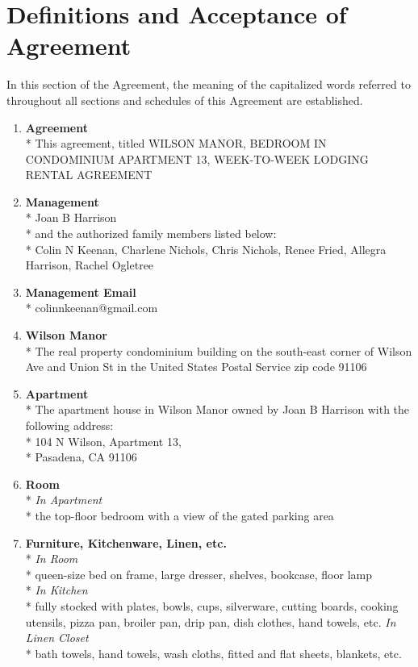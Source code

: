 \documentclass[12pt,letterpaper]{article}
\newcommand{\agreementtitle}{WILSON MANOR, BEDROOM IN CONDOMINIUM APARTMENT 13, WEEK-TO-WEEK LODGING RENTAL AGREEMENT}
\newcommand{\definitions}{Definitions and Acceptance of Agreement}
\newcommand{\mom}{Joan B Harrison}
\newcommand{\management}{Management}
\newcommand{\myemail}{Management Email}
\newcommand{\condo}{Wilson Manor}
\newcommand{\apt}{Apartment}
\newcommand{\room}{Room}
\newcommand{\furniture}{Furniture, Kitchenware, Linen, etc.}
\begin{document}
	\section{\definitions{}} \label{definitions}
In this section of the Agreement, the meaning of the capitalized words referred to throughout all sections and schedules of this Agreement are established.
\begin{multicols}{2}
	\begin{enumerate} 
		\item \textbf{Agreement}\\* \label{agreement}
			This agreement, titled \agreementtitle{}
		\item \textbf{\management{}}\\* \label{management}
			\noindent \mom{}\\*
			and the authorized family members listed below:\\*
			Colin N Keenan,
			Charlene Nichols,
			Chris Nichols,
			Renee Fried,
			Allegra Harrison,
			Rachel Ogletree
				
		\item \textbf{\myemail{}}\\* \label{myemail}
			colinnkeenan@gmail.com

		\item \textbf{\condo{}}\\* \label{condo}
			The real property condominium building on the south-east corner of Wilson Ave and Union St in the United States Postal Service zip code 91106

		\item \textbf{\apt{}}\\* \label{apt}
			The apartment house in \condo{} owned by \mom{} with the following address:\\*
			104 N Wilson, \apt{} 13,\\* 
			Pasadena, CA  91106


\vfill
\columnbreak
		\item \textbf{\room{}}\\* \label{room}
			\textit{In \apt{}}\\*
			the top-floor bedroom with a view of the gated parking area

		\item \textbf{\furniture{}}\\* \label{furniture}
			\textit{In \room{}}\\*
			queen-size bed on frame, large dresser, shelves, bookcase, floor lamp\\*
			\textit{In Kitchen}\\*
			fully stocked with plates, bowls, cups, silverware, cutting boards, cooking utensils, pizza pan, broiler pan, drip pan, dish clothes, hand towels, etc.
			\textit{In Linen Closet}\\*
			bath towels, hand towels, wash cloths, fitted and flat sheets, blankets, etc.


\end{enumerate}
\end{multicols}
\end{document}
